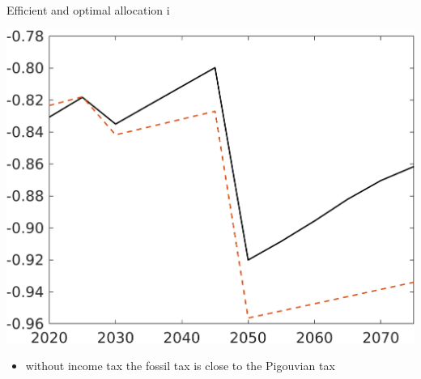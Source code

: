 \documentclass[11pt,aspectratio=169]{beamer}
\begin{document}
\begin{frame}{Efficient and optimal allocation i}
\begin{minipage}[]{0.32\textwidth}
		\includegraphics[width=1\textwidth]{../codding_model/own_basedOnFried/optimalPol_elastS_DisuSci/figures/all_1705/SWF_CompEffOPT_T_NoTaus_noopt_spillover0_noskill0_sep1_BN0_ineq0_red0_xgrowth0_zero0_countec0_etaa0.79_lgd0.png}
	\end{minipage}

\vspace{6mm}
\begin{itemize}
	\item without income tax the fossil tax is close to the Pigouvian tax
\end{itemize}
\end{frame}
\end{document}
